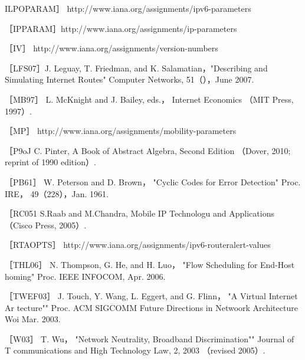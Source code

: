 ILPOPARAM］ http://www.iana.org/assignments/ipv6-parameters

［IPPARAM］http://www.iana.org/assignments/ip-parameters

［IV］ http://www.iana.org/assignments/version-numbers

［LFS07］J. Leguay, T. Friedman, and K. Salamatian，"Describing and Simulating
Internet Routes" Computer Networks, 51（），June 2007.

［MB97］ L. McKnight and J. Bailey, eds.， Internet Economics （MIT Press, 1997）.

［MP］ http://www.iana.org/assignments/mobility-parameters

［P9oJ C. Pinter, A Book of Abstract Algebra, Second Edition （Dover,
2010; reprint of
1990 edition）.

［PB61］ W. Peterson and D. Brown， "Cyclic Codes for Error Detection" Proc. IRE，
49（228），Jan. 1961.

［RC051 S.Raab and M.Chandra, Mobile IP Technologu and Applications （Cisco
Press, 2005）.

［RTAOPTS］ http://www.iana.org/assignments/ipv6-routeralert-values

［THL06］ N. Thompson, G. He, and H. Luo， "Flow Scheduling for End-Host
homing" Proc. IEEE INFOCOM, Apr. 2006.

［TWEF03］ J. Touch, Y. Wang, L. Eggert, and G. Flinn， "A Virtual Internet Ar
tecture"" Proc. ACM SIGCOMM Future Directions in Netwoork Architecture Woi
Mar. 2003.

［W03］ T. Wu， "Network Neutrality, Broadband Discrimination"" Journal of T
communications and High Technology Law, 2, 2003 （revised 2005）.
